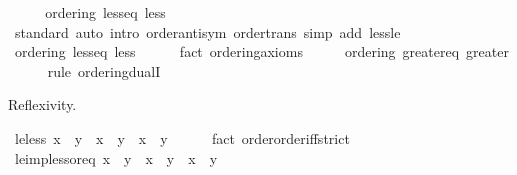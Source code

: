 \begin{isabellebody}
%
\isadelimproof
%
\endisadelimproof
%
\isatagproof
{}\isamarkupfalse%
\ {\isacharminus}{\kern0pt}\isanewline
\ \ \isamarkupfalse%
\ ordering\ less{\isacharunderscore}{\kern0pt}eq\ less\isanewline
\ \ \ \ \isamarkupfalse%
\ standard\ {\isacharparenleft}{\kern0pt}auto\ intro{\isacharcolon}{\kern0pt}\ order{\isacharunderscore}{\kern0pt}antisym\ order{\isacharunderscore}{\kern0pt}trans\ simp\ add{\isacharcolon}{\kern0pt}\ less{\isacharunderscore}{\kern0pt}le{\isacharparenright}{\kern0pt}\isanewline
\ \ \isamarkupfalse%
\ {\isachardoublequoteopen}ordering\ less{\isacharunderscore}{\kern0pt}eq\ less{\isachardoublequoteclose}\isanewline
\ \ \ \ \isamarkupfalse%
\ {\isacharparenleft}{\kern0pt}fact\ ordering{\isacharunderscore}{\kern0pt}axioms{\isacharparenright}{\kern0pt}\isanewline
\ \ \isamarkupfalse%
\ \isamarkupfalse%
\ {\isachardoublequoteopen}ordering\ greater{\isacharunderscore}{\kern0pt}eq\ greater{\isachardoublequoteclose}\isanewline
\ \ \ \ \isamarkupfalse%
\ {\isacharparenleft}{\kern0pt}rule\ ordering{\isacharunderscore}{\kern0pt}dualI{\isacharparenright}{\kern0pt}\isanewline
{}\isamarkupfalse%
%
\endisatagproof
{\isafoldproof}%
%
\isadelimproof
\isanewline
%
\endisadelimproof
\isanewline
{}\isamarkupfalse%
%
\begin{isamarkuptext}%
Reflexivity.%
\end{isamarkuptext}\isamarkuptrue%
\isamarkupfalse%
\ le{\isacharunderscore}{\kern0pt}less{\isacharcolon}{\kern0pt}\ {\isachardoublequoteopen}x\ {\isasymle}\ y\ {\isasymlongleftrightarrow}\ x\ {\isacharless}{\kern0pt}\ y\ {\isasymor}\ x\ {\isacharequal}{\kern0pt}\ y{\isachardoublequoteclose}\isanewline
\ \ \ \ %
\isanewline
%
\isadelimproof
%
\endisadelimproof
%
\isatagproof
{}\isamarkupfalse%
\ {\isacharparenleft}{\kern0pt}fact\ order{\isachardot}{\kern0pt}order{\isacharunderscore}{\kern0pt}iff{\isacharunderscore}{\kern0pt}strict{\isacharparenright}{\kern0pt}%
\endisatagproof
{\isafoldproof}%
%
\isadelimproof
\isanewline
%
\endisadelimproof
\isanewline
{}\isamarkupfalse%
\ le{\isacharunderscore}{\kern0pt}imp{\isacharunderscore}{\kern0pt}less{\isacharunderscore}{\kern0pt}or{\isacharunderscore}{\kern0pt}eq{\isacharcolon}{\kern0pt}\ {\isachardoublequoteopen}x\ {\isasymle}\ y\ {\isasymLongrightarrow}\ x\ {\isacharless}{\kern0pt}\ y\ {\isasymor}\ x\ {\isacharequal}{\kern0pt}\ y{\isachardoublequoteclose}\isanewline

\end{isabellebody}
